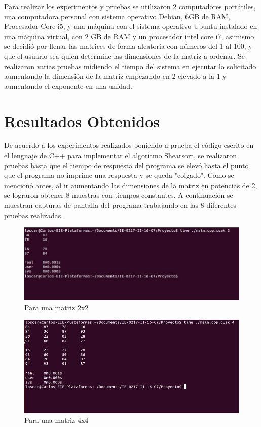 \documentclass[11pt]{article}
\begin{document}
Para realizar los experimentos y pruebas se utilizaron 2 computadores portátiles, una computadora personal con sistema operativo Debian, 6GB de RAM, Procesador Core i5, y una máquina con el sistema operativo Ubuntu instalado en una máquina virtual, con 2 GB de RAM y un procesador intel core i7, asimismo se decidió por llenar las matrices de forma aleatoria con números del 1 al 100, y que el usuario sea quien determine las dimensiones de la matriz a ordenar. Se realizaron varias pruebas midiendo el tiempo del sistema en ejecutar lo solicitado aumentando la dimensión de la matriz empezando en 2 elevado a la 1 y aumentando el exponente en una unidad.  

\section{Resultados Obtenidos}
De acuerdo a los experimentos realizados poniendo a prueba el código escrito en el lenguaje de C++ para implementar el algoritmo Shearsort, se realizaron pruebas hasta que el tiempo de respuesta del programa se elevó hasta el punto que el programa no imprime una respuesta y se queda "colgado". Como se mencionó antes, al ir aumentando las dimensiones de la matriz en potencias de 2, se lograron obtener 8 muestras con tiempos constantes, A continuación se muestran capturas de pantalla del programa trabajando en las 8 diferentes pruebas realizadas.

\begin{figure}[H]
\centering
\includegraphics[scale=1]{2x2.jpg}
\caption{Para una matriz 2x2}
\label{fig:6}
\end{figure}

\begin{figure}[H]
\centering
\includegraphics[scale=1]{4x4.jpg}
\caption{Para una matriz 4x4}
\label{fig:7}
\end{figure}
\end{document}
